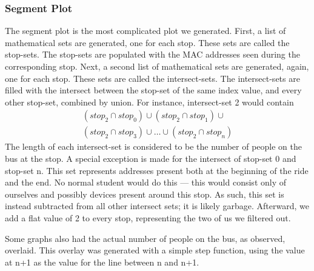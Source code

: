 \subsubsection*{Segment Plot}
The segment plot is the most complicated plot we generated.
First, a list of mathematical sets are generated, one for each stop.
These sets are called the stop-sets.
The stop-sets are populated with the MAC addresses seen during the corresponding stop.
Next, a second list of mathematical sets are generated, again, one for each stop.
These sets are called the intersect-sets.
The intersect-sets are filled with the intersect between the stop-set of the same index value, and every other stop-set, combined by union.
For instance, intersect-set 2 would contain
\begin{multline*}
  \left(stop_2 \cap stop_0\right) \cup \left(stop_2 \cap stop_1\right) \cup \\
  \left(stop_2 \cap stop_3\right) \cup \dots \cup \left(stop_2 \cap stop_n\right)
\end{multline*}
The length of each intersect-set is considered to be the number of people on the bus at the stop.
A special exception is made for the intersect of stop-set 0 and stop-set n.
This set represents addresses present both at the beginning of the ride and the end.
No normal student would do this --- this would consist only of ourselves and possibly devices present around this stop.
As such, this set is instead subtracted from all other intersect sets; it is likely garbage.
Afterward, we add a flat value of 2 to every stop, representing the two of us we filtered out.

Some graphs also had the actual number of people on the bus, as observed, overlaid.
This overlay was generated with a simple step function, using the value at n+1 as the value for the line between n and n+1.
